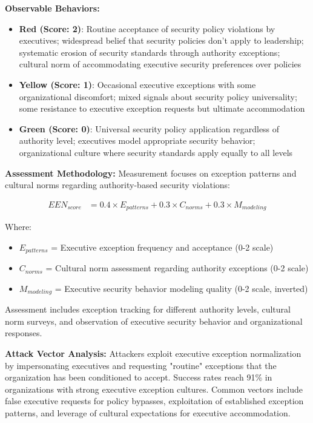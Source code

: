 \documentclass[11pt,a4paper]{article}
\begin{document}
\textbf{Observable Behaviors:}
\begin{itemize}
\item \textbf{Red (Score: 2)}: Routine acceptance of security policy violations by executives; widespread belief that security policies don't apply to leadership; systematic erosion of security standards through authority exceptions; cultural norm of accommodating executive security preferences over policies
\item \textbf{Yellow (Score: 1)}: Occasional executive exceptions with some organizational discomfort; mixed signals about security policy universality; some resistance to executive exception requests but ultimate accommodation
\item \textbf{Green (Score: 0)}: Universal security policy application regardless of authority level; executives model appropriate security behavior; organizational culture where security standards apply equally to all levels
\end{itemize}

\textbf{Assessment Methodology:}
Measurement focuses on exception patterns and cultural norms regarding authority-based security violations:

\begin{align}
EEN_{score} &= 0.4 \times E_{patterns} + 0.3 \times C_{norms} + 0.3 \times M_{modeling}
\end{align}

Where:
\begin{itemize}
\item $E_{patterns}$ = Executive exception frequency and acceptance (0-2 scale)
\item $C_{norms}$ = Cultural norm assessment regarding authority exceptions (0-2 scale)
\item $M_{modeling}$ = Executive security behavior modeling quality (0-2 scale, inverted)
\end{itemize}

Assessment includes exception tracking for different authority levels, cultural norm surveys, and observation of executive security behavior and organizational responses.

\textbf{Attack Vector Analysis:}
Attackers exploit executive exception normalization by impersonating executives and requesting "routine" exceptions that the organization has been conditioned to accept. Success rates reach 91\% in organizations with strong executive exception cultures. Common vectors include false executive requests for policy bypasses, exploitation of established exception patterns, and leverage of cultural expectations for executive accommodation.
\end{document}

